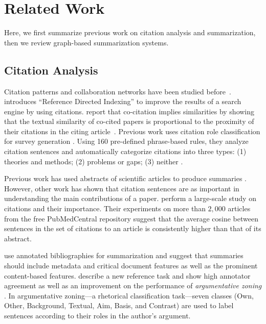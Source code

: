 \section{Related Work}
\label{sec:rel}
Here, we first summarize previous work on citation analysis and summarization, then
we review graph-based summarization systems. 

\subsection{Citation Analysis}
Citation patterns and collaboration networks have been studied
before~\cite{Newman01a,leskovec2005graphs}.  
introduces ``Reference Directed Indexing'' to improve the results of a
search engine by using citations.
 report that co-citation implies similarities
by showing that the textual similarity of co-cited papers is
proportional to the proximity of their citations in the citing
article~\cite{NanbaKO00}.  Previous work uses citation role
classification for survey generation
\cite{teufel2006,Nanba&Okumura99}.  Using 160 pre-defined phrase-based
rules, they analyze citation sentences and automatically
categorize citations into three types: (1) theories and methods; (2)
problems or gaps; (3) neither \cite{NanbaKO00,NanbaEtal04}.

Previous work has used abstracts of scientific articles to produce
summaries \cite{Kupiec95}.  However, other work has shown that 
citation sentences are as important in understanding the main
contributions of a paper.   perform a
large-scale study on citations and their importance. Their experiments
on more than $2,000$ articles from the free PubMedCentral repository
suggest that the average cosine between sentences in the set of
citations to an article is consistently higher than that of its
abstract.  

 use annotated bibliographies for summarization and
suggest that summaries should include metadata and critical document
features as well as the prominent content-based
features.  describe a new reference task and show
high annotator agreement as well as an improvement on the performance
of \emph{argumentative zoning} \cite{teufel2005}.  In argumentative
zoning---a rhetorical classification task---seven classes (Own, Other,
Background, Textual, Aim, Basis, and Contrast) are used to label
sentences according to their roles in the author's argument.


